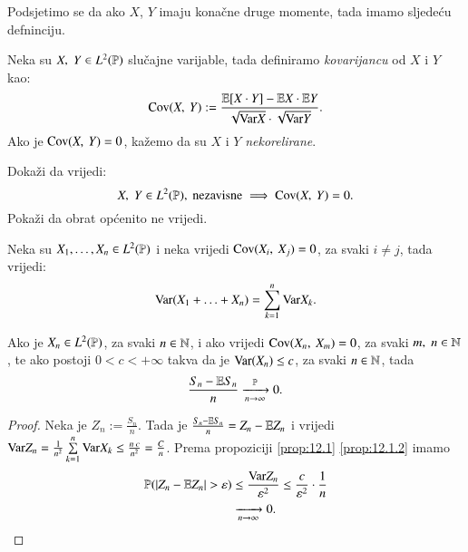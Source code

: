 Podsjetimo se da ako $X$, $Y$ imaju kona\v cne druge momente, tada imamo sljede\' cu defninciju.

\begin{defn}    \label{defn:12.1-1}
    Neka su $X, \; Y \in L^2(\mathbb{P})$ slu\v cajne varijable, tada definiramo \emph{kovarijancu} od $X$ i $Y$ kao:
    \begin{equation}    \label{jed:12.2}
        \mathrm{Cov} ({X}, \: {Y}) := \frac{\mathbb{E} [X \cdot Y] - \mathbb{E} X \cdot \mathbb{E} Y}{\sqrt{\mathrm{Var} X} \cdot \sqrt{\mathrm{Var} Y}}.
    \end{equation}
    Ako je $\mathrm{Cov} ({X}, \: {Y}) = 0$, ka\v zemo da su $X$ i $Y$ \emph{nekorelirane}.
\end{defn}

\begin{zad} \label{zad:12.3}
    Doka\v zi da vrijedi:
    \begin{equation*}
        X, \; Y \in L^2(\mathbb{P}), \textnormal{ nezavisne} \implies \mathrm{Cov} ({X}, \: {Y}) = 0.
    \end{equation*}
    Poka\v zi da obrat op\' cenito ne vrijedi.
\end{zad}

\begin{zad} \label{zad:12.4}
    Neka su $X_1, \ldots, X_n \in L^2(\mathbb{P})$ i neka vrijedi $\mathrm{Cov} ({X_i}, \: {X_j}) = 0$, za svaki $i \neq j$, tada vrijedi:
    \begin{equation*}
        \mathrm{Var} (X_1 + \ldots + X_n) = \sum\limits_{k = 1}^{n} \mathrm{Var} X_k.
    \end{equation*}
\end{zad}

\begin{tm}  \label{tm:12.5}
    Ako je $X_n \in L^2 (\mathbb{P})$, za svaki $n \in \mathbb{N}$, i ako vrijedi $\mathrm{Cov} ({X_n}, \: {X_m}) = 0$, za svaki $m, \; n \in \mathbb{N}$, te ako postoji $0 < c < + \infty$ takva da je $\mathrm{Var} (X_n) \leq c$, za svaki $n \in \mathbb{N}$, tada
    \begin{equation*}
        \frac{S_n - \mathbb{E} S_n}{n} \xrightarrow[n \to \infty]{\mathbb{P}} 0.
    \end{equation*}
\end{tm}

\begin{proof}
    Neka je $Z_n := \frac{S_n}{n}$.
    Tada je $\frac{S_n - \mathbb{E} S_n}{n} = Z_n - \mathbb{E} Z_n$ i vrijedi $\mathrm{Var} Z_n = \frac{1}{n^2} \sum\limits_{k = 1}^{n} \mathrm{Var} X_k \leq \frac{n \: c}{n^2} = \frac{C}{n}$.
    Prema propoziciji \ref{prop:12.1} \ref{prop:12.1.2} imamo
    \begin{equation*}
        \begin{aligned}
            \mathbb{P}({|Z_n - \mathbb{E} Z_n| > \varepsilon}) & \leq \frac{\mathrm{Var} Z_n}{\varepsilon^2} \leq \frac{c}{\varepsilon^2} \cdot \frac{1}{n}\\
            & \xrightarrow[n \to \infty]{} 0.
        \end{aligned}
    \end{equation*}
\end{proof}

